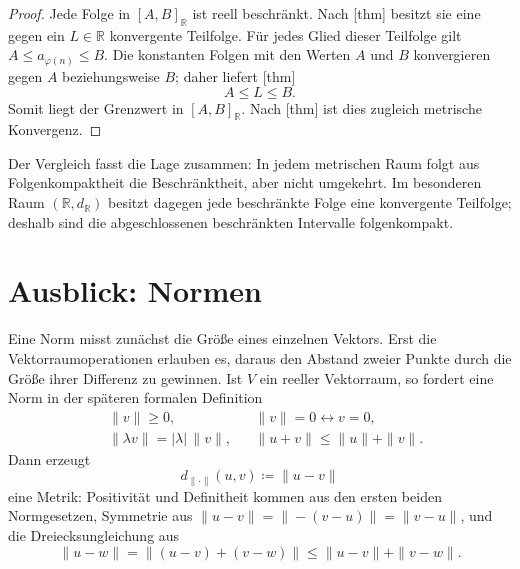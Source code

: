 \documentclass[main.tex]{subfiles}
\begin{document}
\begin{proof}
Jede Folge in \([A,B]_{\mathbb R}\) ist reell beschränkt. Nach
[thm] besitzt sie eine gegen
ein \(L\in\mathbb R\) konvergente Teilfolge. Für jedes Glied dieser
Teilfolge gilt \(A\leq a_{\varphi(n)}\leq B\). Die konstanten Folgen mit den
Werten \(A\) und \(B\) konvergieren gegen \(A\) beziehungsweise \(B\); daher
liefert
[thm]
\[
 A\leq L\leq B.
\]
Somit liegt der Grenzwert in \([A,B]_{\mathbb R}\). Nach
[thm] ist dies zugleich
metrische Konvergenz.
\end{proof}

Der Vergleich fasst die Lage zusammen: In jedem metrischen Raum folgt aus
Folgenkompaktheit die Beschränktheit, aber nicht umgekehrt. Im besonderen
Raum \((\mathbb R,d_{\mathbb R})\) besitzt dagegen jede beschränkte Folge
eine konvergente Teilfolge; deshalb sind die abgeschlossenen beschränkten
Intervalle folgenkompakt.



\chapter{Ausblick: Normen}

Eine Norm misst zunächst die Größe eines einzelnen Vektors. Erst die
Vektorraumoperationen erlauben es, daraus den Abstand zweier Punkte durch die
Größe ihrer Differenz zu gewinnen. Ist \(V\) ein reeller Vektorraum, so
fordert eine Norm in der späteren formalen Definition
\[
\begin{aligned}
 &\|v\|\geq0,
 &&\|v\|=0\leftrightarrow v=0,\\
 &\|\lambda v\|=|\lambda|\,\|v\|,
 &&\|u+v\|\leq\|u\|+\|v\|.
\end{aligned}
\]
Dann erzeugt
\[
 d_{\|\cdot\|}(u,v)\coloneqq\|u-v\|
\]
eine Metrik: Positivität und Definitheit kommen aus den ersten beiden
Normgesetzen, Symmetrie aus
\(\|u-v\|=\|-(v-u)\|=\|v-u\|\), und die Dreiecksungleichung aus
\[
 \|u-w\|=\|(u-v)+(v-w)\|
 \leq\|u-v\|+\|v-w\|.
\]
\end{document}
